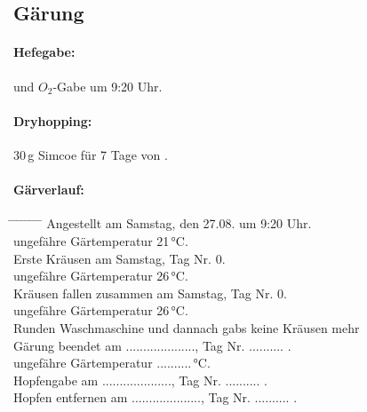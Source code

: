 \documentclass[12pt,oneside,a4paper]{scrartcl}
\begin{document}
{		\subsection*{Gärung}
		\paragraph{Hefegabe:} und $O_2$-Gabe um 9:20 Uhr.
		\paragraph{Dryhopping:} 30\,g Simcoe für 7 Tage von .
		\paragraph{Gärverlauf:}
		\begin{tabbing}
			\hspace{1cm} \= \hspace{1cm} \= \hspace{1cm} \= \hspace{1cm} \= \hspace{1cm} \= \hspace{1cm} \= \hspace{1cm} \= \hspace{1cm} \= \kill
			\> Angestellt am Samstag, den 27.08. um 9:20 Uhr.\\
			\> \> ungefähre Gärtemperatur  21\,°C.\\
			\> Erste Kräusen am Samstag,  Tag Nr. 0.\\
			\> \> ungefähre Gärtemperatur 26\,°C.\\
			\> Kräusen fallen zusammen am Samstag, Tag Nr. 0.\\
			\> \> ungefähre Gärtemperatur 26\,°C.\\
			\>  Runden Waschmaschine und dannach gabs keine Kräusen mehr\\
			\> Gärung beendet am ...................., Tag Nr. .......... .\\
			\> \> ungefähre Gärtemperatur ..........\,°C.\\
			\> Hopfengabe am ...................., Tag Nr. .......... .\\
			\> Hopfen entfernen am ...................., Tag Nr. .......... .
		\end{tabbing}
}
\end{document}
